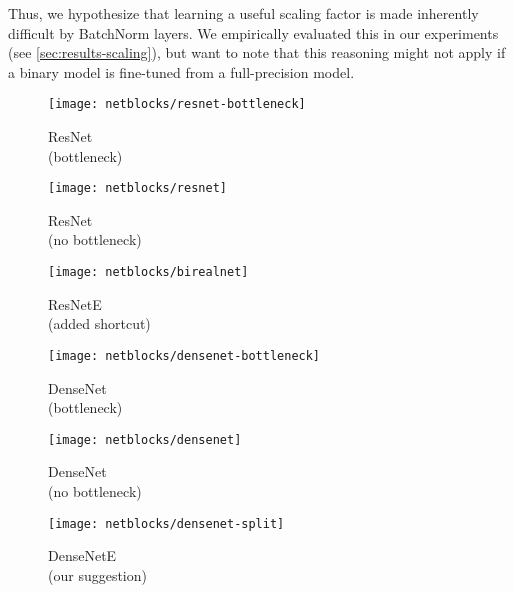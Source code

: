 \documentclass[10pt,twocolumn,letterpaper]{article}
\begin{document}
Thus, we hypothesize that learning a useful scaling factor is made inherently difficult by BatchNorm layers.
We empirically evaluated this in our experiments (see \autoref{sec:results-scaling}), but want to note that this reasoning might not apply if a binary model is fine-tuned from a full-precision model. %
\captionsetup[subfigure]{justification=centering}
\begin{center}
\begin{subfigure}[t]{0.32\linewidth}
   \centering
   \texttt{[image: netblocks/resnet-bottleneck]}
   \caption{ResNet \\ (bottleneck)}
   \label{fig:netblocks-resnet-bottleneck}
\end{subfigure}
\begin{subfigure}[t]{0.32\linewidth}
   \centering
   \texttt{[image: netblocks/resnet]}
   \caption{ResNet \\ (no bottleneck)}
   \label{fig:netblocks-resnet}
\end{subfigure}
\begin{subfigure}[t]{0.32\linewidth}
   \centering
   \texttt{[image: netblocks/birealnet]}
   \caption{ResNetE \\ (added shortcut)}
   \label{fig:netblocks-resnete}
\end{subfigure}
\begin{subfigure}[t]{0.32\linewidth}
   \centering
   \texttt{[image: netblocks/densenet-bottleneck]}
   \caption{DenseNet \\ (bottleneck)}
   \label{fig:netblocks-densenet-bottleneck}
\end{subfigure}
\begin{subfigure}[t]{0.32\linewidth}
   \centering
   \texttt{[image: netblocks/densenet]}
   \caption{DenseNet \\ (no bottleneck)}
   \label{fig:netblocks-densenet}
\end{subfigure}
\begin{subfigure}[t]{0.32\linewidth}
   \centering
   \texttt{[image: netblocks/densenet-split]}
   \caption{DenseNetE \\ (our suggestion)}
   \label{fig:netblocks-densenet-split}
\end{subfigure}
\end{center}
\end{document}

